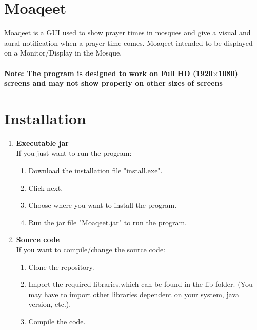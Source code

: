 \documentclass[12pt,a4paper]{article}
\begin{document}
\section*{Moaqeet}
Moaqeet is a GUI used to show prayer times in mosques and give a visual and aural notification when a prayer time comes. Moaqeet intended to be displayed on a Monitor/Display in the Mosque.\\\\
 \textbf{Note: The program is designed to work on Full HD (1920$\times$1080) screens and may not show properly on other sizes of screens}

\section*{Installation}
\begin{enumerate}
\item \textbf{Executable jar}\\
If you just want to run the program:
\begin{enumerate}
\item Download the installation file "install.exe". 
\item Click next.
\item Choose where you want to install the program.
\item Run the jar file "Moaqeet.jar" to run the program.
\end{enumerate}
\item \textbf{Source code}\\
If you want to compile/change the source code:
\begin{enumerate}
\item Clone the repository. 
\item Import the required libraries,which can be found in the lib folder. (You may have to import other libraries dependent on your system, java version, etc.).
\item Compile the code.
\end{enumerate}
\end{enumerate}
\end{document}
